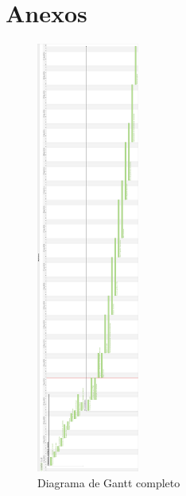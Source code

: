 \section{Anexos}
\begin{figure}[H] 
	\centering
	\includegraphics[width=0.3\textwidth]{images/plano_de_trabalho/gannt_0.png}
 	\caption{Diagrama de Gantt completo}
 	\label{fig: workplan0}
\end{figure}
